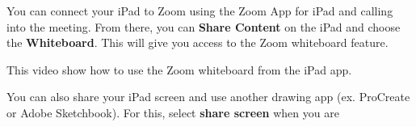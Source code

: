\begin{gram} You can connect your iPad to Zoom using the Zoom App for iPad and calling into the meeting. 
 From there, you can \textbf{Share Content} on the iPad and choose the \textbf{Whiteboard}. This will give you access to the Zoom whiteboard feature.

This video show how to use the Zoom whiteboard from the iPad app.

\end{gram}


\begin{gram}
You can also share your iPad screen and use another drawing app (ex. ProCreate or Adobe Sketchbook). For this, select \textbf{share screen} when you are 


\end{gram}


